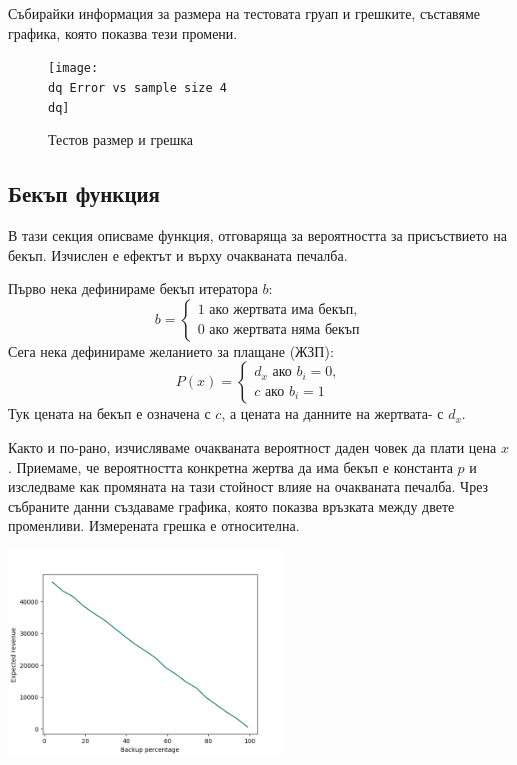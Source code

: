 \documentclass[11pt, a4paper]{article}
\theoremstyle{definition}
\begin{document}
			Събирайки информация за размера на тестовата груап и грешките, съставяме графика, която показва тези промени.
			\begin{figure}[H]
			\begin{minipage}{1.0\textwidth}
				\centering
				\texttt{[image: \\dq Error vs sample size 4\\dq]}
				\caption{Тестов размер и грешка}\label{Fig:Data5}
			\end{minipage}
			\end{figure}
		\subsection{Бекъп функция}
			В тази секция описваме функция, отговаряща за вероятността за присъствието на бекъп. Изчислен е ефектът и върху очакваната печалба.\par
			Първо нека дефинираме бекъп итератора $b$: 
			$$
			b=
			\begin{cases}
				1 \text{ ако жертвата има бекъп},\\
				0 \text{ ако жертвата няма бекъп}
			\end{cases}
			$$
			Сега нека дефинираме желанието за плащане (ЖЗП):
			$$
			P(x)=
			\begin{cases}
			d_{x} \text{ ако } b_{i}=0,\\
			c \text{ ако } b_{i}=1
			\end{cases}
			$$
			Тук цената на бекъп е означена с $c$, а цената на данните на жертвата- с $d_{x}$.\par
			Както и по-рано, изчисляваме очакваната вероятност даден човек да плати цена $x$.
			Приемаме, че вероятността конкретна жертва да има бекъп е константа $p$ и изследваме как промяната на тази стойност влияе на очакваната печалба. Чрез събраните данни създаваме графика, която показва връзката между двете променливи. Измерената грешка е относителна.
			\begin{center}
				\includegraphics[width=0.55\textwidth]{Revenue_vs_backup}
			\end{center}
			
\end{document}
